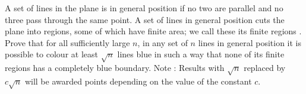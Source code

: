 A set of lines in the plane is in 
general position
 if no two are parallel and no three pass through the same point. A set of lines in general position cuts the plane into regions, some of which have finite area; we call these its 
finite regions
. Prove that for all sufficiently large 
$n$, 
 in any set of 
$n$
 lines in general position it is possible to colour at least 
$\sqrt{n}$
 lines blue in such a way that none of its finite regions has a completely blue boundary.
Note
: Results with 
$\sqrt{n}$
 replaced by 
$c\sqrt{n}$
 will be awarded points depending on the value of the constant 
$c$.


